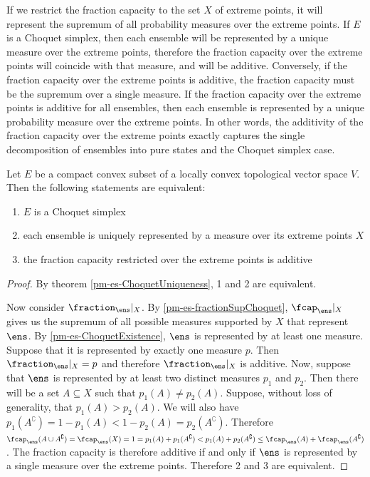 If we restrict the fraction capacity to the set $X$ of extreme points, it will represent the supremum of all probability measures over the extreme points. If $E$ is a Choquet simplex, then each ensemble will be represented by a unique measure over the extreme points, therefore the fraction capacity over the extreme points will coincide with that measure, and will be additive. Conversely, if the fraction capacity over the extreme points is additive, the fraction capacity must be the supremum over a single measure. If the fraction capacity over the extreme points is additive for all ensembles, then each ensemble is represented by a unique probability measure over the extreme points. In other words, the additivity of the fraction capacity over the extreme points exactly captures the single decomposition of ensembles into pure states and the Choquet simplex case.

\begin{mathSection}
\begin{prop}
	Let $E$ be a compact convex subset of a locally convex topological vector space $V$. Then the following statements are equivalent:
	\begin{enumerate}
		\item $E$ is a Choquet simplex
		\item each ensemble is uniquely represented by a measure over its extreme points $X$
		\item the fraction capacity restricted over the extreme points is additive
	\end{enumerate}
\end{prop}

\begin{proof}
	By theorem \ref{pm-es-ChoquetUniqueness}, 1 and 2 are equivalent. 
	
	Now consider $\fraction_{\ens}|_X$. By \ref{pm-es-fractionSupChoquet}, $\fcap_{\ens}|_X$ gives us the supremum of all possible measures supported by $X$ that represent $\ens$. By \ref{pm-es-ChoquetExistence}, $\ens$ is represented by at least one measure. Suppose that it is represented by exactly one measure $p$. Then $\fraction_{\ens}|_X = p$ and therefore $\fraction_{\ens}|_X$ is additive. Now, suppose that $\ens$ is represented by at least two distinct measures $p_1$ and $p_2$. Then there will be a set $A \subseteq X$ such that $p_1(A) \neq p_2(A)$. Suppose, without loss of generality, that $p_1(A) > p_2(A)$. We will also have $p_1(A^{\complement}) = 1- p_1(A) < 1 - p_2(A) = p_2(A^{\complement})$. Therefore $\fcap_{\ens}(A \cup A^{\complement})=\fcap_{\ens}(X) = 1 = p_1(A) + p_1(A^{\complement}) < p_1(A) + p_2(A^{\complement}) \leq \fcap_{\ens}(A) + \fcap_{\ens}(A^{\complement})$. The fraction capacity is therefore additive if and only if $\ens$ is represented by a single measure over the extreme points. Therefore 2 and 3 are equivalent.
\end{proof}
\end{mathSection}

